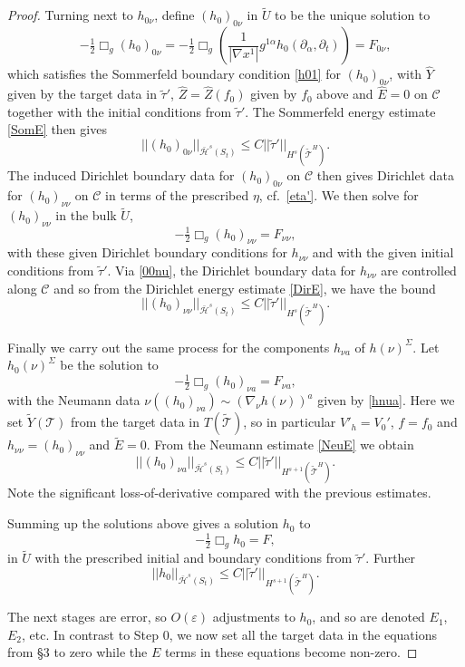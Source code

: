 \documentclass[10pt]{amsart}
\renewcommand{\a}{\alpha}
\newcommand{\e}{\varepsilon}
\newcommand{\Si}{\Sigma}
\newcommand{\cC}{{\mathcal C}}
\newcommand{\cT}{{\mathcal T}}
\newcommand{\cH}{{\mathcal H}}
\newcommand{\be}{\begin{equation}}
\newcommand{\ee}{\end{equation}}
\newcommand{\p}{\partial}
\renewcommand{\hat}{\widehat}
\newcommand{\<}{\langle}
\renewcommand{\>}{\rangle}
\newcommand{\w}{\widetilde}
\theoremstyle{plain}
\theoremstyle{remark}
\theoremstyle{definition}
\numberwithin{equation}{section}
\begin{document}
\begin{proof}
   Turning next to $h_{0\nu}$, define $(h_0)_{0\nu}$ in $\w U$ to be the unique solution to 
$$-\tfrac{1}{2}\Box_g (h_0)_{0\nu} = -\tfrac{1}{2}\Box_g( \frac{1}{|\nabla x^1|}g^{1 \a}h_0(\p_{\a}, \p_t)) = F_{0\nu},$$
which satisfies the Sommerfeld boundary condition \eqref{h01} for $(h_0)_{0\nu}$, with $\hat Y$ given by the target data in $\w \tau'$, $\hat Z 
= \hat Z(f_0)$ given by $f_0$ above and $\hat E = 0$ on $\cC$ together with the initial conditions from $\w \tau'$. The Sommerfeld energy 
estimate \eqref{SomE} then gives 
\be \label{00nu}
||(h_0)_{0\nu}||_{\bar \cH^s(S_t)} \leq C||\w \tau'||_{H^s(\w \cT^H)}.
\ee
The induced Dirichlet boundary data for $(h_0)_{0\nu}$ on $\cC$ then gives Dirichlet data for $(h_0)_{\nu \nu}$ on $\cC$ in terms of 
the prescribed $\eta$, cf.~\eqref{eta'}. We then solve for $(h_0)_{\nu \nu}$ in the bulk $\w U$, 
$$-\tfrac{1}{2}\Box_g (h_0)_{\nu \nu}  = F_{\nu \nu},$$
with these given Dirichlet boundary conditions for $h_{\nu \nu}$ and with the given initial conditions from $\w \tau'$. Via \eqref{00nu}, the 
Dirichlet boundary data for $h_{\nu\nu}$ are controlled along $\cC$ and so from the Dirichlet energy estimate \eqref{DirE}, we have the bound 
$$||(h_0)_{\nu\nu}||_{\bar \cH^s(S_t)} \leq C||\w \tau'||_{H^s(\w \cT^H)}.$$
 
   Finally we carry out the same process for the components $h_{\nu a}$ of $h(\nu)^{\Si}$. Let $h_0(\nu)^{\Si}$ be the solution to 
$$-\tfrac{1}{2}\Box_g (h_0)_{\nu a} = F_{\nu a},$$
with the Neumann data $\nu((h_0)_{\nu a}) \sim (\nabla_{\nu}h(\nu))^a$ given by \eqref{hnua}. Here we set $\w Y(\cT)$ from 
the target data in $T(\w \cT)$, so in particular $V'_h = V_0'$, $f = f_0$ and $h_{\nu \nu} = (h_0)_{\nu\nu}$ and $\w E = 0$. From the Neumann estimate 
\eqref{NeuE} we obtain 
\be \label{0nua}
||(h_0)_{\nu a}||_{\bar \cH^s(S_t)} \leq C||\w \tau'||_{H^{s+1}(\w \cT^H)}.
\ee
Note the significant loss-of-derivative compared with the previous estimates. 

 Summing up the solutions above gives a solution $h_0$ to 
\be \label{h0F}
-\tfrac{1}{2}\Box_g h_0 = F,
\ee
in $\w U$ with the prescribed initial and boundary conditions from $\w \tau'$. Further 
$$||h_0||_{\bar \cH^s(S_t)} \leq C||\w \tau'||_{H^{s+1}(\w \cT^H)}.$$


 The next stages are error, so $O(\e)$ adjustments to $h_0$, and so are denoted $E_1$, $E_2$, etc. In contrast to 
Step 0, we now set all the target data in the equations from \S 3 to zero while the $E$ terms in these equations become non-zero. 


\end{proof}
\end{document}
